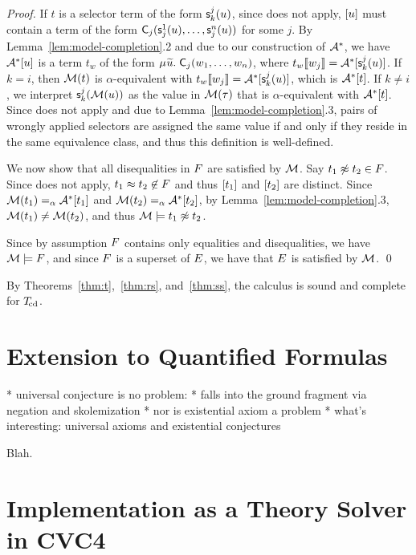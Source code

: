 \begin{proof}
If $t$ is a selector term of the form $\textsf{s}^j_k( u )$,
since  does not apply,
$[u]$ must contain a term of the form $\textsf{C}_j( \textsf{s}^1_j( u ), \ldots, \textsf{s}^{n}_j( u ) )$ for some $j$.
By Lemma~\ref{lem:model-completion}.2 and due to our construction of $\mathcal{A}^\ast$, we have $\mathcal{A}^\ast [u]$ is a term $t_w$ of the form
$\MU {\Varec{u}}.\; \const C_j( w_1, \ldots, w_n )$,
where $t_w \llbracket  w_j  \rrbracket = \mathcal{A}^\ast [ \textsf{s}^j_k( u )]$. 
If $k = i$, then $\mathcal{M}( t )$ is $\alpha$-equivalent with $t_w\llbracket w_j \rrbracket = \mathcal{A}^\ast [ \textsf{s}^j_k( u )]$,
which is $\mathcal{A}^\ast [t]$.
If $k \neq i$, we interpret $\textsf{s}^j_k( \mathcal{M}( u ) )$ as the value in $\mathcal{M}( \tau )$ that is $\alpha$-equivalent with $\mathcal{A}^\ast [ t ]$.
Since  does not apply and due to Lemma~\ref{lem:model-completion}.3,
pairs of wrongly applied selectors are assigned the same value if and only if they reside in the same equivalence class,
and thus this definition is well-defined.

We now show that all disequalities in $F$ are satisfied by $\mathcal{M}$.
Say $t_1 \not\approx t_2 \in F$.
Since  does not apply, $t_1 \approx t_2 \not\in F$ and thus $[t_1]$ and $[t_2]$ are distinct.
Since $\mathcal{M}( t_1 ) \mathrel{=_\alpha} \mathcal{A}^\ast [t_1]$ and $\mathcal{M}( t_2 ) \mathrel{=_\alpha} \mathcal{A}^\ast [t_2]$,
by Lemma~\ref{lem:model-completion}.3, $\mathcal{M}( t_1 ) \neq \mathcal{M}( t_2 )$, and thus $\mathcal{M} \models t_1 \not\approx t_2$.

Since by assumption $F$ contains only equalities and disequalities, we have $\mathcal{M} \models F$,
and since $F$ is a superset of $E$, we have that $E$ is satisfied by $\mathcal{M}$.
\qed
\end{proof}

By Theorems~\ref{thm:t},~\ref{thm:rs}, and~\ref{thm:ss}, the calculus is sound and complete for $T_{\!\mathrm{cd}}$.

\section{Extension to Quantified Formulas}
\label{sec:extension-to-quantified-formulas}

  * universal conjecture is no problem:
    * falls into the ground fragment via negation
      and skolemization
  * nor is existential axiom a problem
  * what's interesting: universal axioms and existential conjectures

Blah.

\section{Implementation as a Theory Solver in CVC4}
\label{sec:the-theory-solver}

